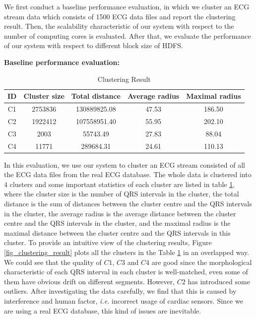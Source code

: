 \documentclass[conference]{IEEEtran}
\begin{document}
We first conduct a baseline performance evaluation, in which we cluster an ECG stream data which consists of 1500 ECG data files and report the clustering result. Then, the scalability characteristic of our system with respect to the number of computing cores is evaluated. After that, we evaluate the performance of our system with respect to different block size of HDFS. 


\textbf{Baseline performance evaluation:}


\begin{table}[!t]\caption{Clustering Result}
\label{tb_clustering_result}
\centering
\begin{tabular}{|c|c|c|c|c|}
\hline
ID & Cluster size & Total distance & Average radius & Maximal radius\\
\hline
C1 & 2753836 & 130889825.08 & 47.53 & 186.50 \\
C2 & 1922412 & 107558951.40 & 55.95 & 202.10 \\
C3 & 2003 & 55743.49 & 27.83 & 88.04 \\
C4 & 11771 & 289684.31 & 24.61 & 110.13 \\
\hline
\end{tabular}
\end{table}
In this evaluation, we use our system to cluster an ECG stream consisted of all the ECG data files from the real ECG database. The whole data is clustered into 4 clusters and some important statistics of each cluster are listed in table \ref{tb_clustering_result}, where the cluster size is the number of QRS intervals in the cluster, the total distance is the sum of distances between the cluster centre and the QRS intervals in the cluster, the average radius is the average distance between the cluster centre and the QRS intervals in the cluster, and the maximal radius is the maximal distance between the cluster centre and the QRS intervals in this cluster. To provide an intuitive view of the clustering results, Figure \ref{fig_clustering_result} plots all the clusters in the Table \ref{tb_clustering_result} in an overlapped way. We could see that the quality of $ C1 $, $ C3 $ and $ C4 $ are good since the morphological characteristic of each QRS interval in each cluster is well-matched, even some of them have obvious drift on different segments. However, $ C2 $ has introduced some outliers. After investigating the data carefully, we find that this is caused by interference and human factor, \textit{i.e.} incorrect usage of cardiac sensors. Since we are using a real ECG database, this kind of issues are inevitable.
\end{document}
